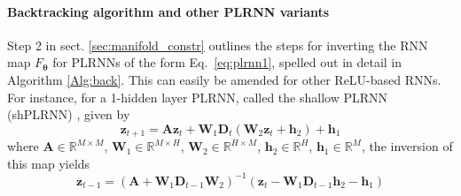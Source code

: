 \documentclass{article}
\theoremstyle{example}
\theoremstyle{plain}
\theoremstyle{definition}
\theoremstyle{remark}
\def\eqref#1{equation~\ref{#1}}
\def\vh{{\bm{h}}}
\def\vz{{\bm{z}}}
\def\mA{{\bm{A}}}
\def\mD{{\bm{D}}}
\def\mW{{\bm{W}}}
\renewcommand{\eqref}[1]{Eq.~\ref{#1}}
\begin{document}
\paragraph{Backtracking algorithm and other PLRNN variants} 
Step 2 in sect. \ref{sec:manifold_constr} outlines the steps for inverting the RNN map $F_{\mathbf{\theta}}$ for PLRNNs of the form \eqref{eq:plrnn1}, spelled out in detail in Algorithm \ref{Alg:back}. This can easily be amended for other ReLU-based RNNs. For instance, for a 1-hidden layer PLRNN, called the shallow PLRNN (shPLRNN) \citep{hess}, given by
\begin{equation}
\vz_{t+1} = \mA \vz_t + \mW_1 \mD_t (\mW_2 \vz_t +\vh_2) + \vh_1
\end{equation}
where $\mA \in \mathbb{R} ^{M\times M}$, $\mW_1 \in \mathbb{R} ^{M\times H}$, $\mW_2 \in \mathbb{R} ^{H\times M}$, $\vh_2 \in \mathbb{R} ^{H}$, $\vh_1 \in \mathbb{R} ^{M}$, %
the inversion of this map yields
\begin{equation}
\vz_{t-1} = (\mA + \mW_1 \mD_{t-1} \mW_2)^{-1}(\vz_t - \mW_1 \mD_{t-1} \vh_2 - \vh_1)
\end{equation}
\end{document}
